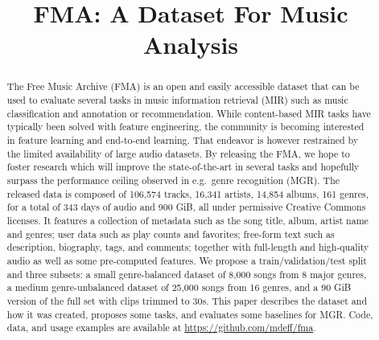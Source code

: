 \documentclass{article}
\title{FMA: A Dataset For Music Analysis}
\newcommand{\ntracks}{106,574 }
\newcommand{\nartists}{16,341 }
\newcommand{\nalbums}{14,854 }
\newcommand{\ngenres}{161 }
\newcommand{\tduration}{343 }
\newcommand{\size}{900 }
\begin{document}
\maketitle

\begin{abstract}
The Free Music Archive (FMA) is an open and easily accessible dataset that can be used to evaluate several tasks in music information retrieval (MIR) such as music classification and annotation or recommendation.
While content-based MIR tasks have typically been solved with feature engineering,
the community is becoming interested in feature learning and end-to-end learning. %
That endeavor is however restrained by the limited availability of large audio datasets.
By releasing the FMA, we hope to foster research which will improve the state-of-the-art in several tasks and hopefully surpass the performance ceiling observed in e.g.\ genre recognition (MGR).
The released data is composed of \ntracks tracks, \nartists artists, \nalbums albums, \ngenres genres, for a total of \tduration days of audio and \size GiB, all under permissive Creative Commons licenses.
It features a collection of metadata such as the song title, album, artist name and genres; user data such as play counts and favorites; free-form text such as description, biography, tags, and comments; together with full-length and high-quality audio as well as some pre-computed features. We propose a train/validation/test split and three subsets: a small genre-balanced dataset of 8,000 songs from 8 major genres, a medium genre-unbalanced dataset of 25,000 songs from 16 genres, and a 90 GiB version of the full set with clips trimmed to 30s.
This paper describes the dataset and how it was created, proposes some tasks, and evaluates some baselines for MGR.
Code, data, and usage examples are available at \url{https://github.com/mdeff/fma}.


\end{abstract}
\end{document}
